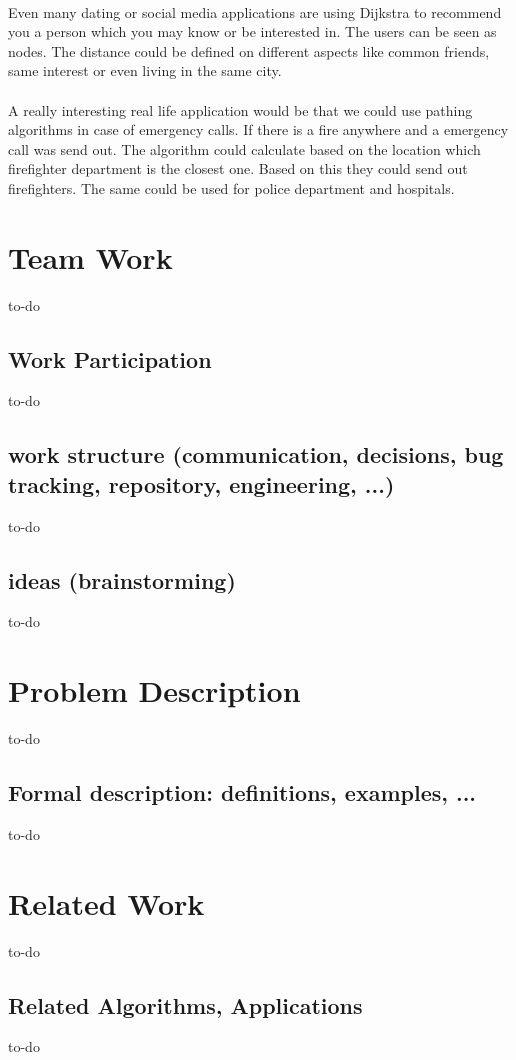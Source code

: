 \documentclass[a4paper,12pt]{article}
\begin{document}
\\Even many dating or social media applications are using Dijkstra to recommend you a person which you may know or be interested in. The users can be seen as nodes. The distance could be defined on different aspects like common friends, same interest or even living in the same city.\\
\\A really interesting real life application would be that we could use pathing algorithms in case of emergency calls. If there is a fire anywhere and a emergency call was send out. The algorithm could calculate based on the location which firefighter department is the closest one. Based on this they could send out firefighters. The same could be used for police department and hospitals.

\section{Team Work}
to-do
\subsection{Work Participation}
to-do

\subsection{work structure (communication, decisions, bug tracking, repository, engineering, ...)}
to-do

\subsection{ideas (brainstorming)}
to-do

\section{Problem Description}
to-do
\subsection{Formal description: definitions, examples, ...}
to-do

\section{Related Work}
to-do
\subsection{Related Algorithms, Applications}
to-do
\end{document}
